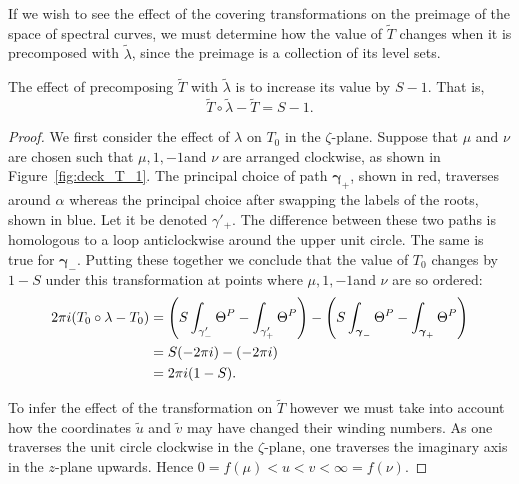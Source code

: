 \documentclass{article}
\begin{document}
If we wish to see the effect of the covering transformations on the preimage of the space of spectral curves, we must determine how the value of $\tilde{T}$ changes when it is precomposed with $\tilde{\lambda}$, since the preimage is a collection of its level sets.

\begin{lem}\label{lem:T shift}
The effect of precomposing $\tilde{T}$ with $\tilde{\lambda}$ is to increase its value by $S-1$. That is,
\[
\tilde{T} \circ \tilde{\lambda} - \tilde{T}
= S-1.
\]
\begin{proof}
We first consider the effect of $\lambda$ on $T_0$ in the $\zeta$-plane. Suppose that $\mu$ and $\nu$ are chosen such that $\mu,1,-1$and $\nu$ are arranged clockwise, as shown in Figure~\ref{fig:deck_T_1}. The principal choice of path $\boldsymbol{\gamma}_+$, shown in red, traverses around $\alpha$ whereas the principal choice after swapping the labels of the roots, shown in blue. Let it be denoted $\gamma'_+$.
The difference between these two paths is homologous to a loop anticlockwise around the upper unit circle. 
The same is true for $\boldsymbol{\gamma}_-$.
Putting these together we conclude that the value of $T_0$ changes by $1-S$ under this transformation at points where $\mu,1,-1$and $\nu$ are so ordered:
\begin{align*}
2\pi i (T_0 \circ \lambda - T_0)
&= \left( S\int_{\gamma'_-} \Theta^P - \int_{\gamma'_+} \Theta^P \right) - \left( S\int_{\boldsymbol{\gamma}_-} \Theta^P - \int_{\boldsymbol{\gamma}_+} \Theta^P \right) \\
&= S(-2\pi i) - (-2\pi i) \\
&= 2\pi i (1-S).
\end{align*}

To infer the effect of the transformation on $\tilde{T}$ however we must take into account how the coordinates $\tilde{u}$ and $\tilde{v}$ may have changed their winding numbers. 
As one traverses the unit circle clockwise in the $\zeta$-plane, one traverses the imaginary axis in the $z$-plane upwards. 
Hence $0 = f(\mu) < u < v < \infty = f(\nu)$.


\end{proof}
\end{lem}
\end{document}
